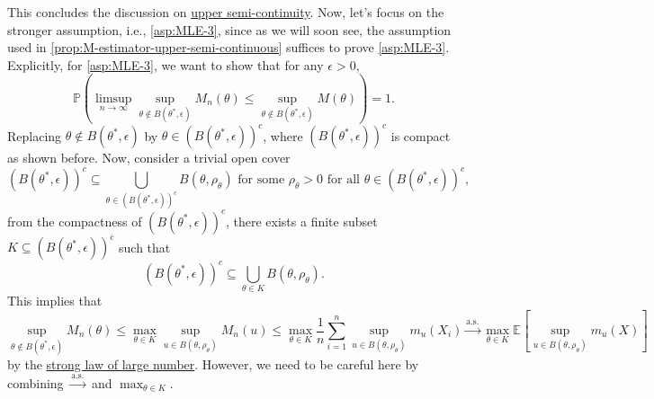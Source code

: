 This concludes the discussion on \hyperref[def:upper-semi-continuous]{upper semi-continuity}. Now, let's focus on the stronger assumption, i.e., \autoref{asp:MLE-3}, since as we will soon see, the assumption used in \autoref{prop:M-estimator-upper-semi-continuous} suffices to prove \autoref{asp:MLE-3}. Explicitly, for \autoref{asp:MLE-3}, we want to show that for any \(\epsilon > 0\),
\[
	\mathbb{P} \left( \limsup_{n \to \infty} \sup _{\theta \notin B(\theta ^{\ast} , \epsilon )} M_n(\theta ) \leq \sup _{\theta \notin B(\theta ^{\ast} , \epsilon )} M(\theta ) \right)
	= 1.
\]
Replacing \(\theta \notin B(\theta ^{\ast} , \epsilon )\) by \(\theta \in (B(\theta ^{\ast} , \epsilon ))^{c} \), where \((B(\theta ^{\ast} , \epsilon ))^{c}\) is compact as shown before. Now, consider a trivial open cover
\[
	(B(\theta ^{\ast} , \epsilon ))^{c}
	\subseteq \bigcup_{\theta \in (B(\theta ^{\ast} , \epsilon ))^{c} } B(\theta , \rho _\theta ) \text{ for some } \rho _\theta > 0 \text{ for all } \theta \in (B(\theta ^{\ast} , \epsilon ))^{c} ,
\]
from the compactness of \((B(\theta ^{\ast} , \epsilon ))^{c} \), there exists a finite subset \(K \subseteq (B(\theta ^{\ast} , \epsilon ))^{c} \) such that
\[
	(B(\theta ^{\ast} , \epsilon ))^{c}
	\subseteq \bigcup_{\theta \in K} B(\theta , \rho _\theta ).
\]
This implies that
\[
	\sup _{\theta \notin B(\theta ^{\ast} , \epsilon )} M_n(\theta )
	\leq \max _{\theta \in K} \sup _{u \in B(\theta , \rho _\theta )} M_n(u)
	\leq \max _{\theta \in K} \frac{1}{n}\sum_{i=1}^{n} \sup _{u \in B(\theta , \rho _\theta )} m_u(X_i)
	\overset{\text{a.s.} }{\to} \max _{\theta \in K} \mathbb{E}_{}\left[\sup _{u \in B(\theta , \rho _\theta )} m_u(X) \right]
\]
by the \hyperref[thm:SLLN]{strong law of large number}. However, we need to be careful here by combining \(\overset{\text{a.s.} }{\to} \) and \(\max _{\theta \in K}\).

